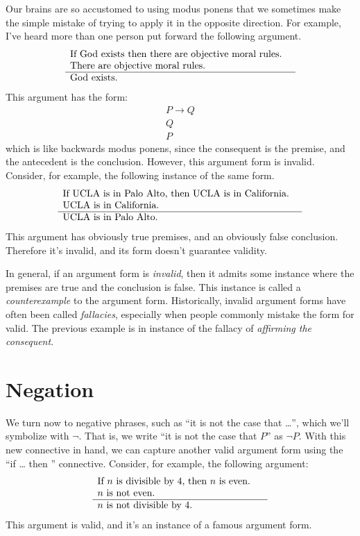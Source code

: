 Our brains are so accustomed to using modus ponens that we sometimes
make the simple mistake of trying to apply it in the opposite
direction.  For example, I've heard more than one person put
forward the following argument.
\[ \begin{array}{p{8cm}}
     If God exists then there are objective moral rules. \\
     There are objective moral rules. \\ \hline
     God  exists. \end{array} \]
 This argument has the form:
 \[ \begin{array}{l}
      P\to Q \\
      Q \\ \hline
      P \end{array} \]
which is like backwards modus ponens, since the consequent is the
premise, and the antecedent is the conclusion.  However, this argument
form is invalid.  Consider, for example, the following instance
of the same form.
\[ \begin{array}{p{8.5cm}}
  If UCLA is in Palo Alto, then UCLA is in California. \\
  UCLA is in California. \\ \hline
  UCLA is in Palo Alto.  \end{array} \]  This argument has obviously
true premises, and an obviously false conclusion.  Therefore it's
invalid, and its form doesn't guarantee validity.  

In general, if an argument form is \emph{invalid}, then it admits some
instance where the premises are true and the conclusion is false.
This instance is called a \emph{\gls{counterexample}} to the argument
form.  Historically, invalid argument forms have often been called
\emph{fallacies}, especially when people commonly mistake the form for
valid.  The previous example is in instance of the fallacy of
\emph{affirming the consequent}.

\section{Negation}

We turn now to negative phrases, such as ``it is not the case that
\dots '', which we'll symbolize with $\neg$.  That is, we write ``it
is not the case that $P$'' as $\neg P$.  With this new connective in
hand, we can capture another valid argument form using the ``if \dots
then '' connective.  Consider, for example, the following argument:
\[ \begin{array}{p{6cm}}
  If $n$ is divisible by $4$, then $n$ is even.      \\ 
  $n$ is not even.       \\ \hline 
  $n$ is not divisible by $4$.     \end{array} \]
This argument is valid, and it's an instance of a famous argument
form.

